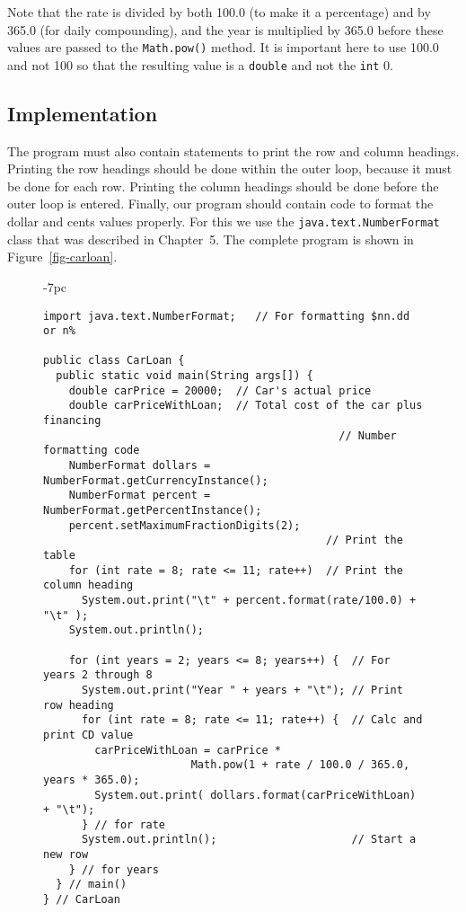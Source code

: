 \noindent Note that the rate is divided by both 100.0 (to make it
a percentage) and by 365.0 (for daily compounding), and the year
is multiplied by 365.0 before these values are passed to the
{\tt Math.pow()} method.   It is important here to use 100.0 and
not 100 so that the resulting value is a {\tt double} and not
the {\tt int} 0.

\subsection*{Implementation}
\noindent The program must also contain statements to print the row and column
headings.  Printing the row headings should be done within the outer
loop, because it must be done for each row.  Printing the column
headings should be done before the outer loop is entered.  Finally, our
program should contain code to format the dollar and cents values
properly.  For this we use the {\tt java.text.NumberFormat} class that
was described in Chapter~5. The complete program is shown in
Figure~\ref{fig-carloan}.
\begin{figure}[h]
\jjjprogstart
\begin{jjjlistingleft}[33pc]{-7pc}
\begin{lstlisting}
import java.text.NumberFormat;   // For formatting $nn.dd or n%

public class CarLoan {
  public static void main(String args[]) {
    double carPrice = 20000;  // Car's actual price
    double carPriceWithLoan;  // Total cost of the car plus financing
                                              // Number formatting code
    NumberFormat dollars = NumberFormat.getCurrencyInstance(); 
    NumberFormat percent = NumberFormat.getPercentInstance();
    percent.setMaximumFractionDigits(2);
                                            // Print the table
    for (int rate = 8; rate <= 11; rate++)  // Print the column heading
      System.out.print("\t" + percent.format(rate/100.0) + "\t" );
    System.out.println();

    for (int years = 2; years <= 8; years++) {  // For years 2 through 8
      System.out.print("Year " + years + "\t"); // Print row heading
      for (int rate = 8; rate <= 11; rate++) {  // Calc and print CD value
        carPriceWithLoan = carPrice * 
                       Math.pow(1 + rate / 100.0 / 365.0, years * 365.0);
        System.out.print( dollars.format(carPriceWithLoan)  + "\t");
      } // for rate
      System.out.println();                     // Start a new row
    } // for years
  } // main()
} // CarLoan
\end{lstlisting}
\end{jjjlistingleft}
\end{figure}

